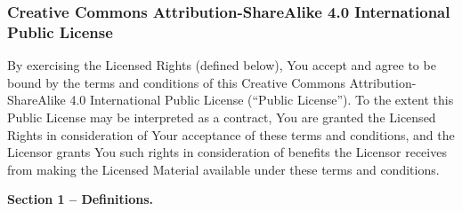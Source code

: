 \subsubsection{Creative Commons Attribution-ShareAlike 4.0 International Public License}
\par By exercising the Licensed Rights (defined below), You accept and agree to be bound by the terms and conditions of this Creative Commons Attribution-ShareAlike 4.0 International Public License (``Public License''). To the extent this Public License may be interpreted as a contract, You are granted the Licensed Rights in consideration of Your acceptance of these terms and conditions, and the Licensor grants You such rights in consideration of benefits the Licensor receives from making the Licensed Material available under these terms and conditions.
\par \textbf{Section 1 – Definitions.}
